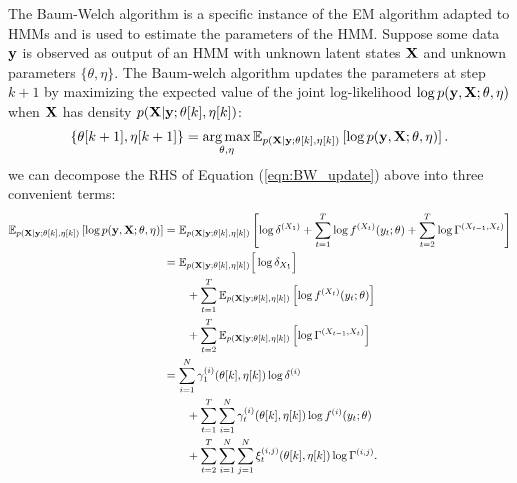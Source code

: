 The Baum-Welch algorithm is a specific instance of the EM algorithm adapted to HMMs and is used to estimate the parameters of the HMM. Suppose some data $\mathbf{y}$ is observed as output of an HMM with unknown latent states $\mathbf{X}$ and unknown parameters $\{\theta,\eta\}$. The Baum-welch algorithm updates the parameters at step $k+1$ by maximizing the expected value of the joint log-likelihood $\log p(\mathbf{y},\mathbf{X}; \theta,\eta)$ when $\mathbf{X}$ has density $p(\mathbf{X} | \mathbf{y};\theta[k],\eta[k])$:
%
\begin{equation}
    \left\{\theta[k+1],\eta[k+1]\right\} = \operatorname*{arg\,max}_{\theta,\eta} \mathbb{E}_{p(\mathbf{X} | \mathbf{y};\theta[k],\eta[k])} \left[\log p(\mathbf{y},\mathbf{X};\theta,\eta)\right].
    \label{eqn:BW_update}
\end{equation}
%
we can decompose the RHS of Equation (\ref{eqn:BW_update}) above into three convenient terms:
\begin{align*}
    \mathbb{E}_{p(\mathbf{X} \mid \mathbf{y};\theta[k],\eta[k])}\left[\log p(\mathbf{y},\mathbf{X};\theta,\eta) \right] &= \mathbb{E}_{p(\mathbf{X} \mid \mathbf{y};\theta[k],\eta[k])} \left[\log \delta^{(X_1)} + \sum_{t=1}^T \log f^{(X_t)}(y_t;\theta) + \sum_{t=2}^{T} \log \Gamma^{(X_{t-1},X_{t})} \right] \\
    &= \mathbb{E}_{p(\mathbf{X} \mid \mathbf{y};\theta[k],\eta[k])} \Big[\log \delta_{X_1}\Big] \\ & \qquad + \sum_{t = 1}^T \mathbb{E}_{p(\mathbf{X} \mid \mathbf{y};\theta[k],\eta[k])} \left[ \log f^{(X_t)}(y_t;\theta)\right] \\ & \qquad + \sum_{t=2}^{T} \mathbb{E}_{p(\mathbf{X} \mid \mathbf{y};\theta[k],\eta[k])} \left[ \log \Gamma^{(X_{t-1},X_{t})} \right] \\
    &= \sum_{i=1}^N \gamma^{(i)}_1(\theta[k],\eta[k]) \log \delta^{(i)} \\ & \qquad + \sum_{t = 1}^T \sum_{i=1}^N \gamma^{(i)}_t(\theta[k],\eta[k]) \log f^{(i)}(y_t;\theta) \\
    & \qquad + \sum_{t=2}^{T} \sum_{i=1}^N \sum_{j=1}^N \xi_t^{(i,j)}(\theta[k],\eta[k]) \log \Gamma^{(i,j)}.
\end{align*}

